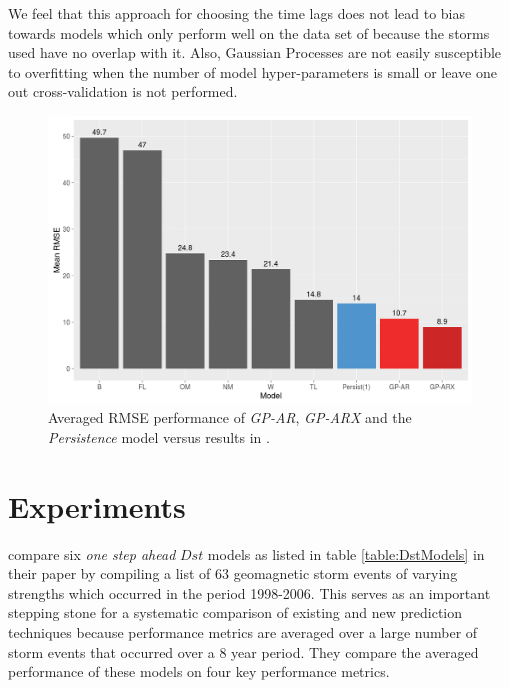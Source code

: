 \documentclass[referee,a4paper,12pt,traditabstract]{swsc}
\begin{document}
\begin{linenumbers}
We feel that this approach for choosing the time lags does not lead to bias towards models which only perform well on the data set of \citet{Ji2012} because the storms used have no overlap with it. Also, Gaussian Processes are not easily susceptible to overfitting when the number of model hyper-parameters is small or leave one out cross-validation is not performed.

\begin{figure}
   \centering
   \includegraphics[width=\textwidth]{Compare_RMSE.png}
      \caption{Averaged RMSE performance of \emph{GP-AR}, \emph{GP-ARX} and the \emph{Persistence} model versus results in \citet{Ji2012}.}
         \label{fig:rmse}
 \end{figure}

\section{Experiments} \label{sec:exp}

\citet{Ji2012} compare six \emph{one step ahead} $Dst$ models as listed in table \ref{table:DstModels} in their paper by compiling a list of 63 geomagnetic storm events of varying strengths which occurred in the period 1998-2006. This serves as an important stepping stone for a systematic comparison of existing and new prediction techniques because performance metrics are averaged over a large number of storm events that occurred over a 8 year period. They compare the averaged performance of these models on four key performance metrics.


\end{linenumbers}
\end{document}
